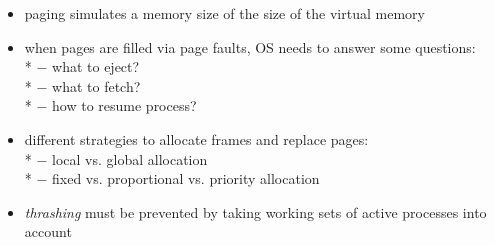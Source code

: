 \begin{summary}
  \begin{itemize}
    \item paging simulates a memory size of the size of the virtual memory
    \item when pages are filled via page faults, OS needs to answer some questions: \\*
      $ - $ what to eject? \\*
      $ - $ what to fetch? \\*
      $ - $ how to resume process?
    \item different strategies to allocate frames and replace pages: \\*
      $ - $ local vs. global allocation \\*
      $ - $ fixed vs. proportional vs. priority allocation
    \item \emph{thrashing} must be prevented by taking working sets of active processes into account
  \end{itemize}
\end{summary}
